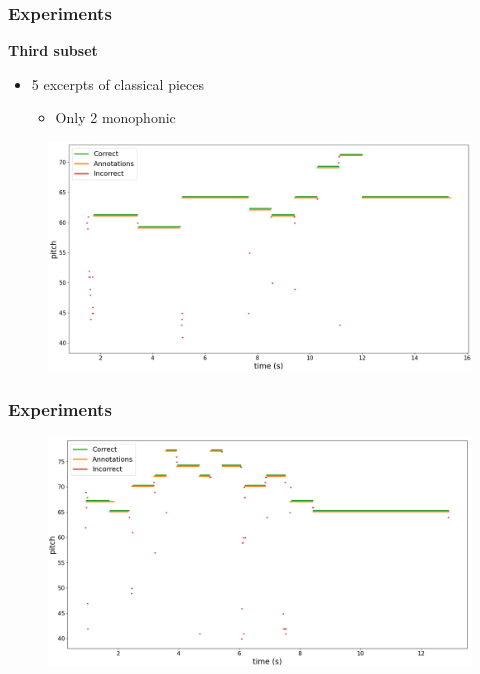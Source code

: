 \documentclass[table]{beamer}
\begin{document}
\begin{frame}
\frametitle{Experiments}
    {\large \textbf{Third subset}}
    \begin{itemize}
        \item 5 excerpts of classical pieces
        \begin{itemize}
            \item[{\LARGE \rotatebox[origin=c]{180}{$\Lsh$}}] Only 2 monophonic
        \end{itemize}
    \end{itemize}

    \begin{figure}[H]
        \includegraphics[width=\linewidth]{figures/dataset3-1.png}
    \end{figure}
\end{frame}
\logo{}
\begin{frame}
\frametitle{Experiments}
    \begin{figure}[H]
        \includegraphics[width=\linewidth]{figures/dataset3-2.png}
    \end{figure}
\end{frame}
\end{document}
